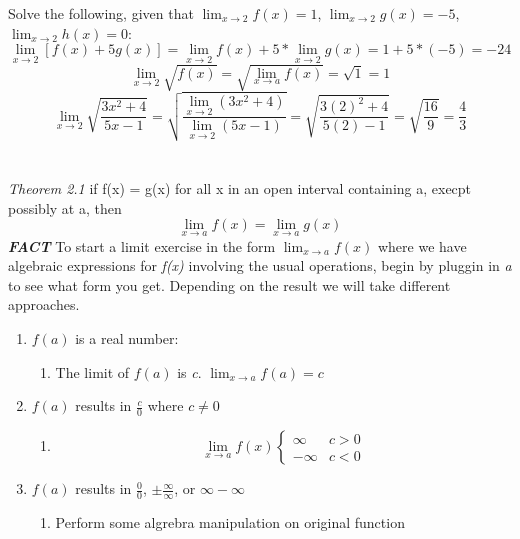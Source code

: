\documentclass{book}
\begin{document}
Solve the following, given that $\lim_{x \to 2} f(x) = 1$, $\lim_{x \to 2} g(x) = -5$, $\lim_{x \to 2} h(x) = 0$:
$$ \lim_{x \to 2} [f(x) + 5g(x)] = \lim_{x \to 2} f(x) + 5 * \lim_{x \to 2} g(x) = 1 + 5*(-5) = -24 $$
$$ \lim_{x \to 2} \sqrt{f(x)} = \sqrt{\lim_{x \to a} f(x)} = \sqrt{1} = 1 $$
$$ \lim_{x \to 2} \sqrt{\frac{3x^2 + 4}{5x - 1}} = \sqrt{\frac{\lim_{x \to 2} (3x^2 + 4)}{\lim_{x \to 2} (5x - 1)}} = \sqrt{\frac{3(2)^2 + 4}{5(2) - 1}} = \sqrt{\frac{16}{9}} = \frac{4}{3}$$
\\ \\
\noindent\emph{Theorem 2.1} if f(x) = g(x) for all x in an open interval containing a, execpt possibly at a, then $$ \lim_{x \to a}f(x) = \lim_{x \to a}g(x) $$
\noindent\emph{\textbf{FACT}} To start a limit exercise in the form $\lim_{x \to a}f(x)$ where we have algebraic expressions for \emph{f(x)} involving the usual operations, begin by pluggin in \emph{a} to see what form you get. Depending on the result we will take different approaches.
\begin{enumerate}
	\item $f(a)$ is a real number:
	\begin{enumerate}
		\item The limit of $f(a)$ is \emph{c}. $\lim_{x \to a}f(a) = c$
	\end{enumerate}
	\item $f(a)$ results in $\frac{c}{0}$ where $c \neq 0$
	\begin{enumerate}
		\item \[ \lim_{x \to a} f(x) \begin{cases} 
      			\infty & c > 0 \\
      			-\infty & c < 0
   				\end{cases}
			  \]
	\end{enumerate}
	\item $f(a)$ results in $\frac{0}{0}$, $\pm \frac{\infty}{\infty}$, or $\infty - \infty$
	\begin{enumerate}
		\item Perform some algrebra manipulation on original function
	\end{enumerate}
\end{enumerate}
\begin{center}
\end{center}
\end{document}
